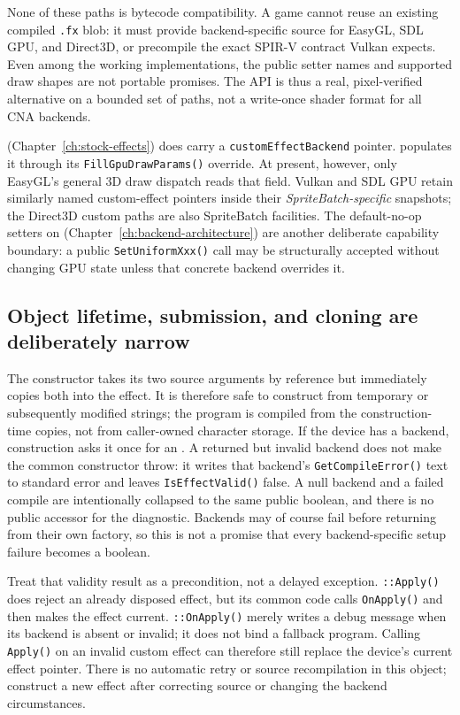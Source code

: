 None of these paths is bytecode compatibility. A game cannot reuse an existing compiled
\texttt{.fx} blob: it must provide backend-specific source for EasyGL, SDL GPU, and Direct3D,
or precompile the exact SPIR-V contract Vulkan expects. Even among the working implementations,
the public setter names and supported draw shapes are not portable promises. The API is thus a
real, pixel-verified alternative on a bounded set of paths, not a write-once shader format for
all CNA backends.

 (Chapter~\ref{ch:stock-effects}) does carry a
\texttt{customEffectBackend} pointer.  populates it through its
\texttt{FillGpuDrawParams()} override. At present, however, only EasyGL's general 3D draw
dispatch reads that field.
Vulkan and SDL GPU retain similarly named custom-effect pointers inside their
\emph{SpriteBatch-specific} snapshots; the Direct3D custom paths are also SpriteBatch
facilities. The default-no-op setters on 
(Chapter~\ref{ch:backend-architecture}) are another deliberate capability boundary: a public
\texttt{SetUniformXxx()} call may be structurally accepted without changing GPU state unless
that concrete backend overrides it.

\subsection{Object lifetime, submission, and cloning are deliberately narrow}

The constructor takes its two source arguments by reference but immediately copies both into
the effect. It is therefore safe to construct from temporary or subsequently modified strings;
the program is compiled from the construction-time copies, not from caller-owned character
storage. If the device has a backend, construction asks it once for an
. A returned but invalid backend does not make the common constructor
throw: it writes that backend's \texttt{GetCompileError()} text to standard error and leaves
\texttt{IsEffectValid()} false. A null backend and a failed compile are intentionally collapsed
to the same public boolean, and there is no public  accessor for the
diagnostic. Backends may of course fail before returning from their own factory, so this is not a
promise that every backend-specific setup failure becomes a boolean.

Treat that validity result as a precondition, not a delayed exception. \texttt{::Apply()}
does reject an already disposed effect, but its common code calls \texttt{OnApply()} and then
makes the effect current. \texttt{::OnApply()} merely writes a debug
message when its backend is absent or invalid; it does not bind a fallback program. Calling
\texttt{Apply()} on an invalid custom effect can therefore still replace the device's current
effect pointer. There is no automatic retry or source recompilation in this object; construct a
new effect after correcting source or changing the backend circumstances.

